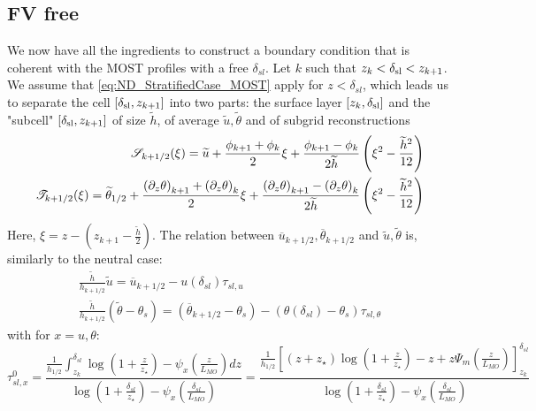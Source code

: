 \subsection{FV free}

We now have all the ingredients to construct a boundary condition
that is coherent with the MOST profiles with a free
$\delta_{sl}$. Let $k$ such that $z_k < \delta_{\rm sl} < z_{k+1}$.
We assume that
\eqref{eq:ND_StratifiedCase_MOST} apply for $z<\delta_{sl}$,
which leads us to separate the 
cell $[\delta_{\rm sl}, z_{k+1}]$
into two parts: the surface layer $[z_k,\delta_{\rm sl}]$ and the
"subcell" $[\delta_{\rm sl}, z_{k+1}]$ of size $\widetilde{h}$, of
average $\widetilde{u}, \widetilde{\theta}$
and of subgrid reconstructions
\begin{equation}
\begin{aligned}
{\cal S}_{k+1/2}(\xi) = \widetilde{u} +
	\frac{\phi_{k+1} + \phi_{k}}{2} \xi
+ \frac{\phi_{k+1} - \phi_{k}}{2\widetilde{h}}
	\left(\xi^2 - \frac{\widetilde{h}^2}{12}\right) \\
{\cal T}_{k+1/2}(\xi) = \widetilde{\theta}_{1/2} +
	\frac{{(\partial_z \theta)}_{k+1} + 
		{(\partial_z \theta)}_{k}}{2} \xi
+ \frac{{(\partial_z \theta)}_{k+1} - {(\partial_z \theta)}_{k}}
	{2\widetilde{h}}
	\left(\xi^2 - \frac{\widetilde{h}^2}{12}\right)
\end{aligned}
\end{equation}
Here, $\xi = z - (z_{k+1} - \frac{\widetilde{h}}{2})$.
The relation between
$\overline{u}_{k+1/2}, \overline{\theta}_{k+1/2}$ and
$\widetilde{u},\widetilde{\theta}$ is, similarly to the neutral case:
\begin{equation} \label{eq:ND_StratifiedCase_tmprelation_tilde_bar}
\begin{aligned}
\frac{\widetilde{h}}{h_{k+1/2}} \widetilde{u} =
	\overline{u}_{k+1/2} - u(\delta_{sl}) \tau_{sl, u}\\
\frac{\widetilde{h}}{h_{k+1/2}} (\widetilde{\theta} - \theta_s) =
	(\overline{\theta}_{k+1/2}-\theta_s) -
	(\theta(\delta_{sl})-\theta_s)\tau_{sl, \theta}
\end{aligned}
\end{equation}
with for $x = u, \theta$:
\begin{equation}
\tau_{sl, x}^0 = \frac{\frac{1}{{h_{1/2}}}\int_{z_k}^{\delta_{sl}} \log(1+\frac{z}{z_{\star}})- \psi_x(\frac{z}{L_{MO}})
    dz}{\log(1+\frac{\delta_{sl}}{z_\star})- \psi_x(\frac{\delta_{sl}}{L_{MO}})
    }
    =
 \frac{\frac{1}{{h_{1/2}}}
    \left[
    (z+z_\star)\log(1+\frac{z}{z_\star})-z
    +
    z \Psi_m(\frac{z}{L_{MO}}) \right]_{z_k}^{\delta_{sl}}
    }{\log(1+\frac{\delta_{sl}}{z_\star})- \psi_x(\frac{\delta_{sl}}{L_{MO}})
    }
\end{equation}
